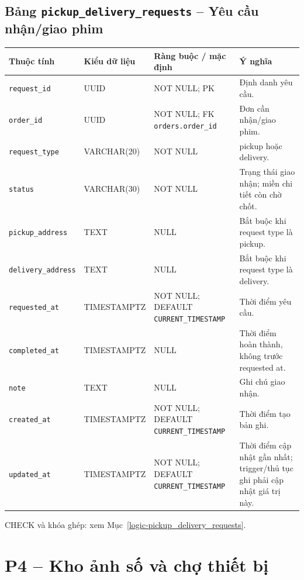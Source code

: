 \subsection{Bảng \texttt{pickup\_\allowbreak{}delivery\_\allowbreak{}requests} -- Yêu cầu nhận/giao phim}
\label{dictionary-pickup_delivery_requests}
\begingroup
\footnotesize
\setlength{\tabcolsep}{3pt}
\begin{longtable}{>{\raggedright\arraybackslash}p{3.1cm}>{\raggedright\arraybackslash}p{2.5cm}>{\raggedright\arraybackslash}p{3.7cm}>{\raggedright\arraybackslash}p{4.3cm}}
\toprule
Thuộc tính & Kiểu dữ liệu & Ràng buộc / mặc định & Ý nghĩa \\
\midrule
\endhead
\texttt{request\_\allowbreak{}id} & UUID & NOT NULL; PK & Định danh yêu cầu. \\
\texttt{order\_\allowbreak{}id} & UUID & NOT NULL; FK \texttt{orders.order\_\allowbreak{}id} & Đơn cần nhận/giao phim. \\
\texttt{request\_\allowbreak{}type} & VARCHAR(20) & NOT NULL & pickup hoặc delivery. \\
\texttt{status} & VARCHAR(30) & NOT NULL & Trạng thái giao nhận; miền chi tiết còn chờ chốt. \\
\texttt{pickup\_\allowbreak{}address} & TEXT & NULL & Bắt buộc khi request type là pickup. \\
\texttt{delivery\_\allowbreak{}address} & TEXT & NULL & Bắt buộc khi request type là delivery. \\
\texttt{requested\_\allowbreak{}at} & TIMESTAMPTZ & NOT NULL; DEFAULT \texttt{CURRENT\_\allowbreak{}TIMESTAMP} & Thời điểm yêu cầu. \\
\texttt{completed\_\allowbreak{}at} & TIMESTAMPTZ & NULL & Thời điểm hoàn thành, không trước requested at. \\
\texttt{note} & TEXT & NULL & Ghi chú giao nhận. \\
\texttt{created\_\allowbreak{}at} & TIMESTAMPTZ & NOT NULL; DEFAULT \texttt{CURRENT\_\allowbreak{}TIMESTAMP} & Thời điểm tạo bản ghi. \\
\texttt{updated\_\allowbreak{}at} & TIMESTAMPTZ & NOT NULL; DEFAULT \texttt{CURRENT\_\allowbreak{}TIMESTAMP} & Thời điểm cập nhật gần nhất; trigger/thủ tục ghi phải cập nhật giá trị này. \\
\bottomrule
\end{longtable}
\endgroup
CHECK và khóa ghép: xem Mục~\ref{logic-pickup_delivery_requests}.
\section{P4 -- Kho ảnh số và chợ thiết bị}
